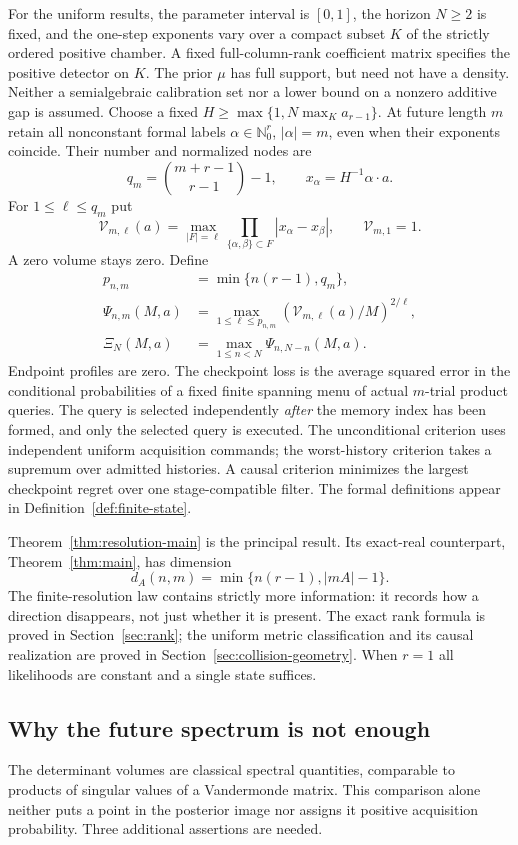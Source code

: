 For the uniform results, the parameter interval is $[0,1]$, the horizon
$N\ge2$ is fixed, and the one-step exponents vary over a compact subset
$K$ of the strictly ordered positive chamber. A fixed full-column-rank
coefficient matrix specifies the positive detector on $K$. The prior
$\mu$ has full support, but need not have a density. Neither a
semialgebraic calibration set nor a lower bound on a nonzero additive
gap is assumed. Choose a fixed
$H\ge\max\{1,N\max_K a_{r-1}\}$. At future length $m$ retain all
nonconstant formal labels $\alpha\in\mathbb N_0^r$, $|\alpha|=m$,
even when their exponents coincide. Their number and normalized nodes are
\[
 q_m=\binom{m+r-1}{r-1}-1,\qquad x_\alpha=H^{-1}\alpha\cdot a.
\]
For $1\le\ell\le q_m$ put
\[
 \mathcal V_{m,\ell}(a)=\max_{|F|=\ell}
       \prod_{\{\alpha,\beta\}\subset F}|x_\alpha-x_\beta|,
 \qquad \mathcal V_{m,1}=1.
\]
A zero volume stays zero. Define
\[
 \begin{split}
 p_{n,m}&=\min\{n(r-1),q_m\},\\
 \Psi_{n,m}(M,a)&=\max_{1\le\ell\le p_{n,m}}
              (\mathcal V_{m,\ell}(a)/M)^{2/\ell},\\
 \Xi_N(M,a)&=\max_{1\le n<N}\Psi_{n,N-n}(M,a).
 \end{split}
\]
Endpoint profiles are zero. The checkpoint loss is the average squared
error in the conditional probabilities of a fixed finite spanning menu
of actual $m$-trial product queries. The query is selected independently
\emph{after} the memory index has been formed, and only the selected
query is executed. The unconditional criterion uses independent uniform
acquisition commands; the worst-history criterion takes a supremum over
admitted histories. A causal criterion minimizes the largest checkpoint
regret over one stage-compatible filter. The formal definitions appear
in Definition~\ref{def:finite-state}.



Theorem~\ref{thm:resolution-main} is the principal result. Its exact-real
counterpart, Theorem~\ref{thm:main}, has dimension
\[
 d_A(n,m)=\min\{n(r-1),|mA|-1\}.
\]
The finite-resolution law contains strictly more information: it records
how a direction disappears, not just whether it is present. The exact
rank formula is proved in Section~\ref{sec:rank}; the uniform metric
classification and its causal realization are proved in
Section~\ref{sec:collision-geometry}. When $r=1$ all likelihoods are
constant and a single state suffices.

\subsection{Why the future spectrum is not enough}
The determinant volumes are classical spectral quantities, comparable to
products of singular values of a Vandermonde matrix. This comparison
alone neither puts a point in the posterior image nor assigns it
positive acquisition probability. Three additional assertions are needed.

